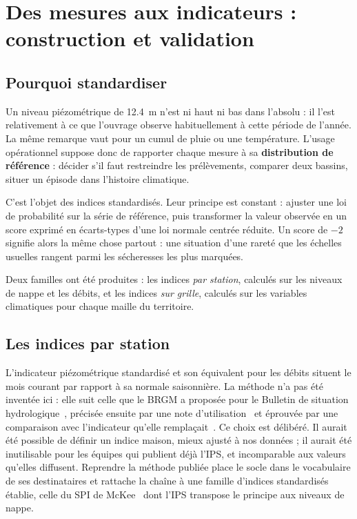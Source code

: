 \chapter{Des mesures aux indicateurs : construction et validation}
\label{ch:indicateurs}


\section{Pourquoi standardiser}

Un niveau piézométrique de \SI{12,4}{\metre} n'est ni haut ni bas dans l'absolu : il l'est
relativement à ce que l'ouvrage observe habituellement à cette période de l'année. La même
remarque vaut pour un cumul de pluie ou une température. L'usage opérationnel suppose donc de rapporter chaque mesure à sa \textbf{distribution de
référence} : décider s'il faut restreindre les prélèvements, comparer deux bassins, situer un
épisode dans l'histoire climatique.

C'est l'objet des indices standardisés. Leur principe est constant : ajuster une loi de
probabilité sur la série de référence, puis transformer la valeur observée en un score exprimé
en écarts-types d'une loi normale centrée réduite. Un score de $-2$ signifie alors la même chose
partout : une situation d'une rareté que les échelles usuelles rangent parmi les sécheresses les
plus marquées.

Deux familles ont été produites : les indices \emph{par station}, calculés sur les niveaux de
nappe et les débits, et les indices \emph{sur grille}, calculés sur les variables climatiques
pour chaque maille du territoire.

\section{Les indices par station}

L'indicateur piézométrique standardisé et son équivalent pour les débits situent le mois courant
par rapport à sa normale saisonnière. La méthode n'a pas été inventée ici : elle suit celle que
le BRGM a proposée pour le Bulletin de situation hydrologique~\cite{seguin2015ips}, précisée
ensuite par une note d'utilisation~\cite{klinka2016ips} et éprouvée par une comparaison avec
l'indicateur qu'elle remplaçait~\cite{seguin2016ipsbilan}. Ce choix est délibéré. Il aurait été
possible de définir un indice maison, mieux ajusté à nos données ; il aurait été inutilisable
pour les équipes qui publient déjà l'IPS, et incomparable aux valeurs qu'elles diffusent.
Reprendre la méthode publiée place le socle dans le vocabulaire de ses destinataires et rattache
la chaîne à une famille d'indices standardisés établie, celle du SPI de
McKee~\cite{mckee1993spi} dont l'IPS transpose le principe aux niveaux de nappe.

